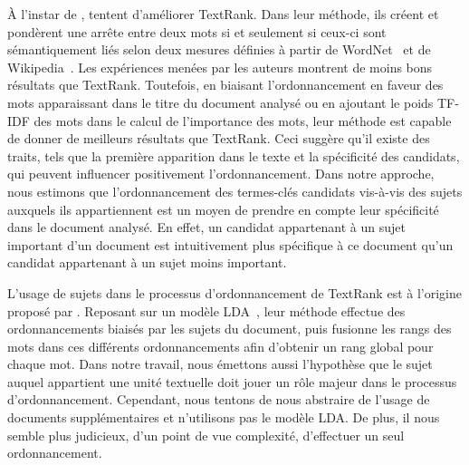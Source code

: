    À l'instar de ,
     tentent d'améliorer TextRank. Dans
    leur méthode, ils créent et pondèrent une arrête entre deux mots si et
    seulement si ceux-ci sont sémantiquement liés selon deux mesures définies à
    partir de WordNet~\cite{miller1995wordnet} et de
    Wikipedia~\cite{milne2008wikipediasemanticrelatedness}. Les expériences
    menées par les auteurs montrent de moins bons résultats que TextRank.
    Toutefois, en biaisant l'ordonnancement en faveur des mots apparaissant dans
    le titre du document analysé ou en ajoutant le poids TF-IDF des mots dans le
    calcul de l'importance des mots, leur méthode est capable de donner de
    meilleurs résultats que TextRank. Ceci suggère qu'il existe des traits, tels
    que la première apparition dans le texte et la spécificité des candidats,
    qui peuvent influencer positivement l'ordonnancement. Dans notre approche,
    nous estimons que l'ordonnancement des termes-clés candidats vis-à-vis des
    sujets auxquels ils appartiennent est un moyen de prendre en compte leur
    spécificité dans le document analysé. En effet, un candidat appartenant à un
    sujet important d'un document est intuitivement plus spécifique à ce
    document qu'un candidat appartenant à un sujet moins important.

    L'usage de sujets dans le processus d'ordonnancement de TextRank est à
    l'origine proposé par . Reposant sur un
    modèle LDA~\cite[Latent Dirichlet Allocation]{blei2003lda}, leur méthode
    effectue des ordonnancements biaisés par les sujets du document, puis
    fusionne les rangs des mots dans ces différents ordonnancements afin
    d'obtenir un rang global pour chaque mot. Dans notre travail, nous émettons
    aussi l'hypothèse que le sujet auquel appartient une unité textuelle doit
    jouer un rôle majeur dans le processus d'ordonnancement. Cependant, nous
    tentons de nous abstraire de l'usage de documents supplémentaires et
    n'utilisons pas le modèle LDA. De plus, il nous semble plus judicieux, d'un
    point de vue complexité, d'effectuer un seul ordonnancement.

